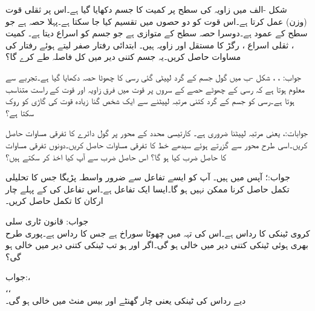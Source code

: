 شکل -الف میں  زاویہ کی سطح پر  کمیت کا جسم دکھایا گیا ہے۔اس پر ثقلی قوت (وزن)  عمل کرتا ہے۔اس قوت کو دو حصوں میں تقسیم کیا جا سکتا ہے۔پہلا حصہ  ہے جو سطح کے عمود ہے۔دوسرا حصہ سطح کے متوازی ہے جو جسم کو اسراع دیتا ہے۔  کمیت ، ثقلی اسراع ، رگڑ کا مستقل  اور زاویہ  ہیں۔ ابتدائی رفتار صفر لیتے ہوئے رفتار  کی مساوات حاصل کریں۔یہ جسم کتنی دیر میں کل  فاصلہ طے کرے گا؟

جواب: ، ، 
شکل -ب میں گول جسم کے گرد لپیٹی گئی رسی کا چھوٹا حصہ دکھایا گیا ہے۔تجربے سے معلوم ہوتا ہے کہ رسی کے چھوٹے حصے کے سروں پر قوت میں فرق زاویہ  اور قوت  کے راست متناسب ہوتا ہے۔رسی کو جسم کے گرد کتنی مرتبہ لپیٹنے سے ایک شخص  گنا زیادہ قوت کی گاڑی کو روک سکتا ہے؟

جوابات:،  یعنی  مرتبہ لپیٹنا ضروری ہے۔
کارتیسی محدد کے محور پر گول دائرے  کا تفرقی مساوات  حاصل کریں۔اسی طرح محور سے گزرتے ہوئے سیدھے خط کا تفرقی مساوات  حاصل کریں۔دونوں تفرقی مساوات کا حاصل ضرب کیا ہو گا؟ اس حاصل ضرب سے آپ کیا اخذ کر سکتے ہیں؟

جواب:؛ آپس میں    ہیں۔
آپ کو ایسے تفاعل سے ضرور واسطہ پڑیگا جس کا تحلیلی تکمل حاصل کرنا ممکن نہیں ہو گا۔ایسا ایک تفاعل  ہے۔اس تفاعل کی  کے پہلے چار ارکان کا تکمل حاصل کریں۔

جواب:
\quad قانون ٹاری سلی\\
کروی ٹینکی کا رداس  ہے۔اس کی تہہ میں چھوٹا سوراخ ہے جس کا رداس  ہے۔پوری طرح بھری ہوئی ٹینکی کتنی دیر میں خالی ہو گی۔اگر  اور  ہو تب ٹینکی کتنی دیر میں خالی ہو گی؟

جواب:،\\
 ،\quad  {}،\\
 دیے رداس کی ٹینکی  یعنی چار گھنٹے اور بیس منٹ میں خالی ہو گی۔

